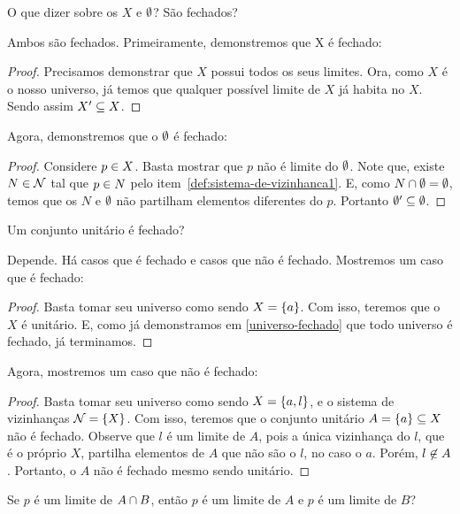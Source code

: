 \begin{question}
	\label{universo-fechado}
	\label{vazio-fechado}
	O que dizer sobre os $X$ e $\emptyset$? São fechados?
\end{question}

\begin{answer}
	Ambos são fechados. Primeiramente, demonstremos que X é fechado:
	\begin{proof}
		Precisamos demonstrar que $X$ possui todos os seus limites. Ora, como $X$ é o nosso universo, já temos que qualquer possível limite de $X$ já habita no $X$. Sendo assim $X^{\prime} \subseteq X$.
	\end{proof}
	Agora, demonstremos que o $\emptyset$ é fechado:
	\begin{proof}
		Considere $p \in X$. Basta mostrar que $p$ não é limite do $\emptyset$. Note que, existe $N \in \mathcal{N}$ tal que $p \in N$ pelo item~\ref{def:sistema-de-vizinhanca1}. E, como $N \cap \emptyset = \emptyset$, temos que os $N$ e $\emptyset$ não partilham elementos diferentes do $p$. Portanto $\emptyset^{\prime} \subseteq \emptyset$.
	\end{proof}
\end{answer}

\begin{question}
	Um conjunto unitário é fechado?
\end{question}

\begin{answer}
	Depende. Há casos que é fechado e casos que não é fechado. Mostremos um caso que é fechado:
	\begin{proof}	
		Basta tomar seu universo como sendo $X = \left\{a\right\}$. Com isso, teremos que o $X$ é unitário. E, como já demonstramos em \ref{universo-fechado} que todo universo é fechado, já terminamos. 
	\end{proof}
	Agora, mostremos um caso que não é fechado:
	\begin{proof}
		Basta tomar seu universo como sendo $X = \left\{a,l\right\}$, e o sistema de vizinhanças $\mathcal{N} = \left\{X\right\}$. Com isso, teremos que o conjunto unitário $A = \left\{a\right\} \subseteq X$ não é fechado. Observe que $l$ é um limite de $A$, pois a única vizinhança do $l$, que é o próprio $X$, partilha elementos de $A$ que não são o $l$, no caso o $a$. Porém, $l \not\in A$. Portanto, o $A$ não é fechado mesmo sendo unitário.
	\end{proof}
\end{answer}

\begin{question}
	Se $p$ é um limite de $A \cap B$, então $p$ é um limite de $A$ e $p$ é um limite de $B$?
\end{question}

